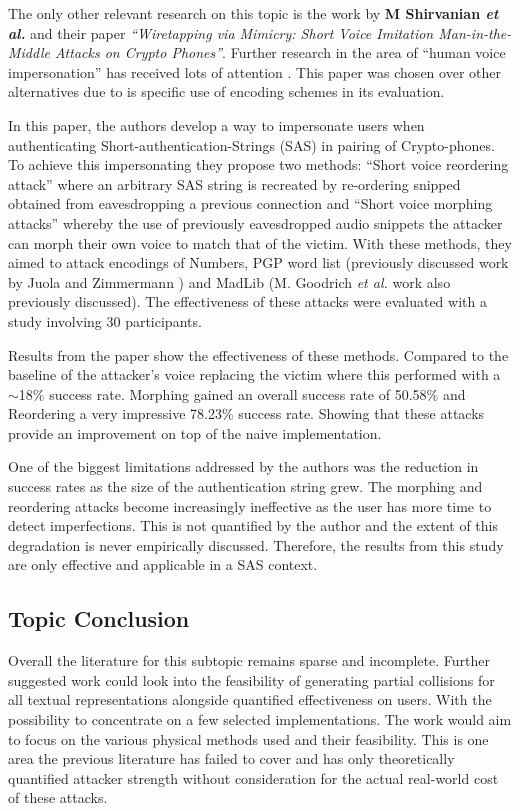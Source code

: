 The only other relevant research on this topic is the work by \textbf{M Shirvanian \textit{et al.}}\cite{shirvanian2014wiretapping} 
and their paper \textit{``Wiretapping via Mimicry: Short 
Voice Imitation Man-in-the-Middle Attacks on Crypto 
Phones''}. Further research in the area of ``human voice impersonation'' has received lots of attention \cite{mukhopadhyay2015all}\cite{chen2017you}\cite{wu2015spoofing}. This paper was chosen over other alternatives due to is specific use of encoding schemes in its evaluation.

In this paper, the authors develop a way to 
impersonate users when authenticating 
Short-authentication-Strings (SAS) in pairing of 
Crypto-phones. To achieve this impersonating they propose 
two methods: ``Short voice reordering attack'' where an 
arbitrary SAS string is recreated by re-ordering snipped 
obtained from eavesdropping a previous connection
and ``Short voice morphing attacks'' whereby the use of 
previously eavesdropped audio snippets the attacker can
morph their own voice to match that of the victim. With 
these methods, they aimed to attack encodings of Numbers, 
PGP word list (previously discussed work by Juola and 
Zimmermann \cite{juola1996whole}) and MadLib (M. Goodrich 
\textit{et al.}\cite{goodrich2006loud} work also 
previously discussed). The effectiveness of these attacks 
were evaluated with a study involving 30 participants.

Results from the paper show the effectiveness of these 
methods. Compared to the baseline of the attacker's voice 
replacing the victim where this performed with a 
$\sim$18\% success rate. Morphing gained an 
overall success rate of 50.58\% and Reordering a very 
impressive 78.23\% success rate. Showing that these 
attacks provide an improvement on top of the naive implementation.

One of the biggest limitations addressed by the authors 
was the reduction in success rates as the size of the 
authentication string grew. The morphing and reordering 
attacks become increasingly ineffective as the user has 
more time to detect imperfections. This is not quantified by 
the author and the extent of this degradation is never 
empirically discussed. Therefore, the results from this 
study are only effective and applicable in a SAS context.

\subsection{Topic Conclusion}
Overall the literature for this subtopic remains sparse and incomplete. Further suggested work could look into the feasibility of generating partial collisions for all textual representations alongside quantified effectiveness on users. With the possibility to concentrate on a few selected implementations. The work would aim to focus on the various physical methods used and their feasibility. This is one area the previous literature has failed to cover and has only theoretically quantified attacker strength without consideration for the actual real-world cost of these attacks.

